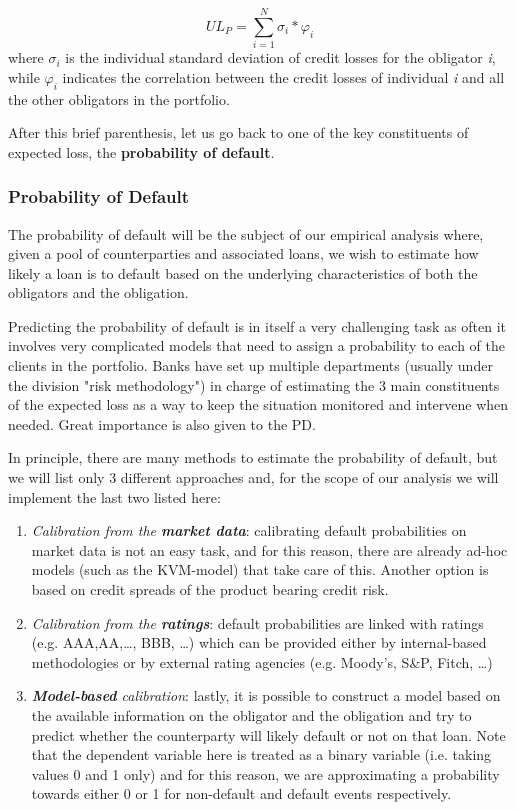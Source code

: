 \documentclass[a4paper,12pt]{article}
\begin{document}
    \begin{equation}
        UL_{P}=\sum_{i=1}^{N} \sigma_{i}*\varphi_{i}
    \end{equation}
    where $\sigma_{i}$ is the individual standard deviation of credit losses for the obligator \textit{i}, while $\varphi_{i}$ indicates the correlation between the credit losses of individual \textit{i} and all the other obligators in the portfolio.

    After this brief parenthesis, let us go back to one of the key constituents of expected loss, the
    \textbf{probability of default}.

    \subsubsection{Probability of Default}

    The probability of default will be the subject of our empirical analysis where, 
    given a pool of counterparties and associated loans, we wish to estimate how
    likely a loan is to default based on the underlying characteristics of both the obligators and the obligation.

    Predicting the probability of default is in itself a very challenging task as often it 
    involves very complicated models that need to assign a probability to each of the clients 
    in the portfolio. Banks have set up multiple departments (usually under the division "risk methodology") 
    in charge of estimating the 3 main constituents of the expected loss as a way to keep the situation 
    monitored and intervene when needed. Great importance is also given to the PD.

    In principle, there are many methods to estimate the probability of default,
    but we will list only 3 different approaches and, for the scope of our analysis
    we will implement the last two listed here:

        \begin{enumerate}
            \item \textit{Calibration from the \textbf{market data}}: calibrating default probabilities on market data is not an easy task, and for this reason, there are already ad-hoc models (such as the KVM-model) that take care of this. Another option is based on credit spreads of the product bearing credit risk.
            \item \textit{Calibration from the \textbf{ratings}}: default probabilities are linked with ratings (e.g. AAA,AA,\dots, BBB, \dots) which can be provided either by internal-based methodologies or by external rating agencies (e.g. Moody's, S\&P, Fitch, \dots)
            \item \textit{\textbf{Model-based} calibration}: lastly, it is possible to construct a model based on the available information on the obligator and the obligation and try to predict whether the counterparty will likely default or not on that loan. Note that the dependent variable here is treated as a binary variable (i.e. taking values 0 and 1 only) and for this reason, we are approximating a probability towards either 0 or 1 for non-default and default events respectively. 
        \end{enumerate}
        
\end{document}
